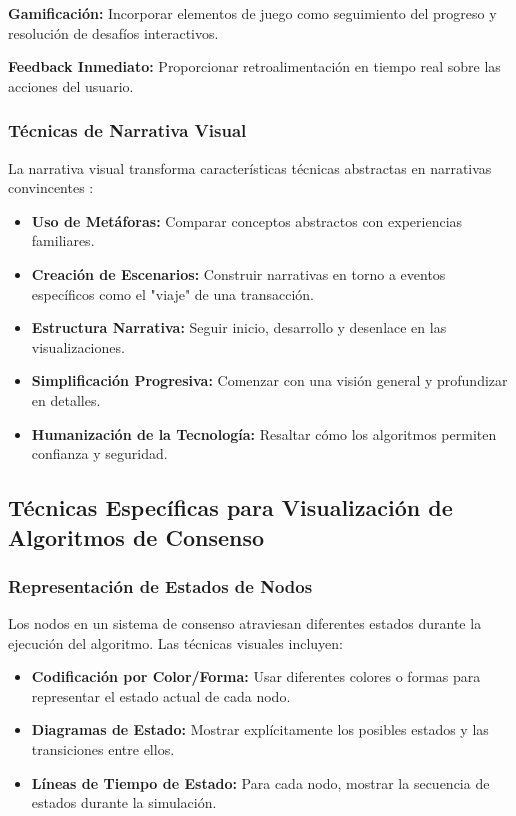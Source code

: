 \documentclass[spanish,12pt,letterpaper]{report}
\begin{document}
\textbf{Gamificación:} Incorporar elementos de juego como seguimiento del progreso y resolución de desafíos interactivos.

\textbf{Feedback Inmediato:} Proporcionar retroalimentación en tiempo real sobre las acciones del usuario.

\subsubsection{Técnicas de Narrativa Visual}

La narrativa visual transforma características técnicas abstractas en narrativas convincentes \parencite{fastercapital2025visual}:

\begin{itemize}
    \item \textbf{Uso de Metáforas:} Comparar conceptos abstractos con experiencias familiares.
    \item \textbf{Creación de Escenarios:} Construir narrativas en torno a eventos específicos como el "viaje" de una transacción.
    \item \textbf{Estructura Narrativa:} Seguir inicio, desarrollo y desenlace en las visualizaciones.
    \item \textbf{Simplificación Progresiva:} Comenzar con una visión general y profundizar en detalles.
    \item \textbf{Humanización de la Tecnología:} Resaltar cómo los algoritmos permiten confianza y seguridad.
\end{itemize}

\subsection{Técnicas Específicas para Visualización de Algoritmos de Consenso}

\subsubsection{Representación de Estados de Nodos}

Los nodos en un sistema de consenso atraviesan diferentes estados durante la ejecución del algoritmo. Las técnicas visuales incluyen:

\begin{itemize}
    \item \textbf{Codificación por Color/Forma:} Usar diferentes colores o formas para representar el estado actual de cada nodo.
    \item \textbf{Diagramas de Estado:} Mostrar explícitamente los posibles estados y las transiciones entre ellos.
    \item \textbf{Líneas de Tiempo de Estado:} Para cada nodo, mostrar la secuencia de estados durante la simulación.
\end{itemize}
\end{document}
